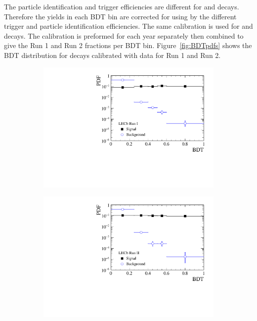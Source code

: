 {The particle identification and trigger efficiencies are different for \bdkpi and \bmumu decays. Therefore the \bdkpi yields in each BDT bin are corrected for using by the different trigger and particle identification efficiencies. The same calibration is used for \bsmumu and \bdmumu decays.
The calibration is preformed for each year separately then combined to give the Run 1 and Run 2 fractions per BDT bin. Figure~\ref{fig:BDTpdfs} shows the BDT distribution for \bmumu decays calibrated with \bdkpi data for Run 1 and Run 2. 

\begin{figure}[htbp]
    \centering
   \begin{subfigure}[b]{0.48\textwidth}
        \includegraphics[width= \textwidth]{./Figs/BFAnalysis/C_macros/BDT_calibration_Run1.pdf}
    \end{subfigure}
    \begin{subfigure}[b]{0.48\textwidth}
       \includegraphics[width=\textwidth]{./Figs/BFAnalysis/C_macros/BDT_calibration_Run2.pdf}

\end{subfigure}
\end{figure}}
